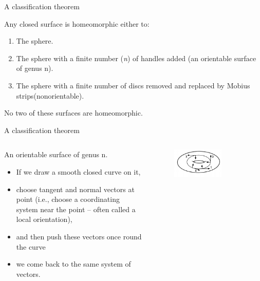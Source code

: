 \documentclass{beamer}
\begin{document}
\begin{frame}{A classification theorem}
  \begin{theorem}
    Any closed surface is homeomorphic either to:
    \begin{enumerate}[label={(\alph*)}]
    \item The sphere.
    \item The sphere with a finite number (\textsl{n}) of handles added (an orientable surface of genus n).
    \item The sphere with a finite number of discs removed and replaced by Mobius strips(nonorientable).
    \end{enumerate}
    No two of these surfaces are homeomorphic.
  \end{theorem}
\end{frame}

\begin{frame}{A classification theorem}
  \begin{columns}
    \begin{column}{0.6\textwidth}
      \begin{block}{}
        An orientable surface of genus n.
        \begin{itemize}
        \item If we draw a smooth closed curve on it,
        \item choose tangent and normal vectors at point (i.e., choose a coordinating system near the point -- often called a local orientation),
        \item and then push these vectors once round the curve
        \item we come back to the same system of vectors.
        \end{itemize}
      \end{block}
    \end{column}
    \begin{column}{0.4\textwidth}
      \begin{figure}
        \centering
        \includegraphics[width=0.7\textwidth]{figure_1_19_a.png}
        \caption{}
      \end{figure}
    \end{column}
  \end{columns}
\end{frame}
\end{document}
